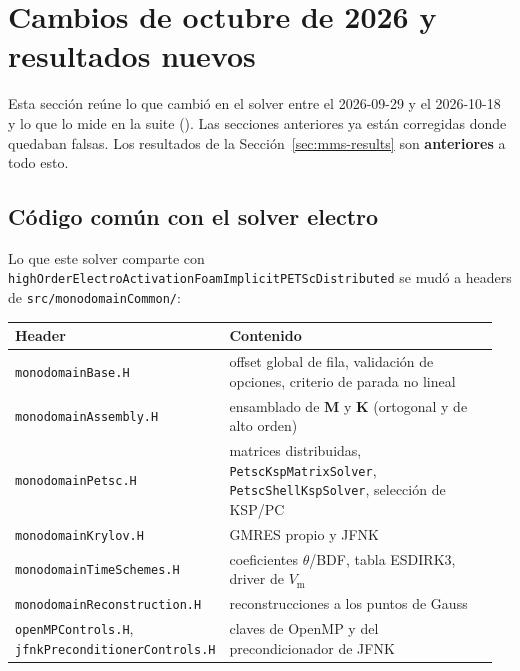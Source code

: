 \documentclass[11pt,a4paper]{article}
\newcommand{\code}[1]{\texttt{\small #1}}
\newcommand{\Vm}{V_{\text{m}}}
\newcommand{\Mmass}{\mathbf{M}}
\newcommand{\Kstif}{\mathbf{K}}
\begin{document}
\section{Cambios de octubre de 2026 y resultados nuevos}
\label{sec:oct2026}

Esta sección reúne lo que cambió en el solver entre el 2026-09-29 y el 2026-10-18 y lo
que lo mide en la suite ().
Las secciones anteriores ya están corregidas donde quedaban falsas. Los resultados de la
Sección~\ref{sec:mms-results} son \textbf{anteriores} a todo esto.

\subsection{Código común con el solver electro}

Lo que este solver comparte con \code{highOrderElectroActivationFoamImplicitPETScDistributed}
se mudó a headers de \code{src/monodomainCommon/}:

\begin{center}
\begin{tabular}{@{}p{0.40\linewidth}p{0.56\linewidth}@{}}
\toprule
Header & Contenido \\
\midrule
\code{monodomainBase.H} & offset global de fila, validación de opciones, criterio de parada no lineal \\
\code{monodomainAssembly.H} & ensamblado de $\Mmass$ y $\Kstif$ (ortogonal y de alto orden) \\
\code{monodomainPetsc.H} & matrices distribuidas, \code{PetscKspMatrixSolver}, \code{PetscShellKspSolver}, selección de KSP/PC \\
\code{monodomainKrylov.H} & GMRES propio y JFNK \\
\code{monodomainTimeSchemes.H} & coeficientes $\theta$/BDF, tabla ESDIRK3, driver de $\Vm$ \\
\code{monodomainReconstruction.H} & reconstrucciones a los puntos de Gauss \\
\code{openMPControls.H}, \code{jfnkPreconditionerControls.H} & claves de OpenMP y del precondicionador de JFNK \\
\bottomrule
\end{tabular}
\end{center}
\end{document}
